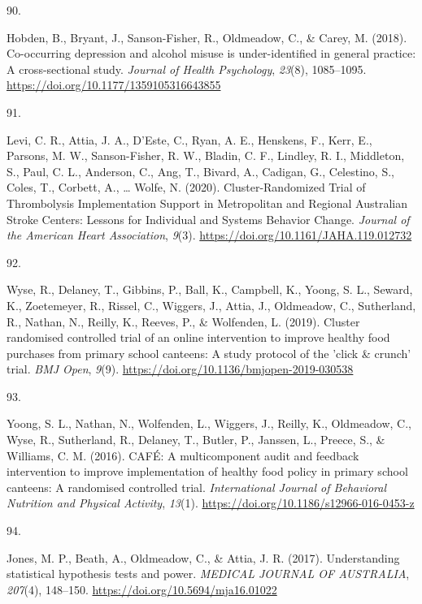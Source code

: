 \documentclass[11pt, a4paper]{awesome-cv}
\newlength{\csllabelwidth}
\newcommand{\CSLLeftMargin}[1]{\parbox[t]{\csllabelwidth}{#1}}
\newcommand{\CSLRightInline}[1]{\parbox[t]{\linewidth - \csllabelwidth}{#1}}
\begin{document}
\leavevmode\hypertarget{ref-hobden_co-occurring_2018}{}%
\CSLLeftMargin{90. }
\CSLRightInline{Hobden, B., Bryant, J., Sanson-Fisher, R., Oldmeadow,
C., \& Carey, M. (2018). Co-occurring depression and alcohol misuse is
under-identified in general practice: A cross-sectional study.
\emph{Journal of Health Psychology}, \emph{23}(8), 1085--1095.
\url{https://doi.org/10.1177/1359105316643855}}

\leavevmode\hypertarget{ref-levi_cluster-randomized_2020}{}%
\CSLLeftMargin{91. }
\CSLRightInline{Levi, C. R., Attia, J. A., D'Este, C., Ryan, A. E.,
Henskens, F., Kerr, E., Parsons, M. W., Sanson-Fisher, R. W., Bladin, C.
F., Lindley, R. I., Middleton, S., Paul, C. L., Anderson, C., Ang, T.,
Bivard, A., Cadigan, G., Celestino, S., Coles, T., Corbett, A., \ldots{}
Wolfe, N. (2020). Cluster-Randomized Trial of Thrombolysis
Implementation Support in Metropolitan and Regional Australian Stroke
Centers: Lessons for Individual and Systems Behavior Change.
\emph{Journal of the American Heart Association}, \emph{9}(3).
\url{https://doi.org/10.1161/JAHA.119.012732}}

\leavevmode\hypertarget{ref-wyse_cluster_2019}{}%
\CSLLeftMargin{92. }
\CSLRightInline{Wyse, R., Delaney, T., Gibbins, P., Ball, K., Campbell,
K., Yoong, S. L., Seward, K., Zoetemeyer, R., Rissel, C., Wiggers, J.,
Attia, J., Oldmeadow, C., Sutherland, R., Nathan, N., Reilly, K.,
Reeves, P., \& Wolfenden, L. (2019). Cluster randomised controlled trial
of an online intervention to improve healthy food purchases from primary
school canteens: A study protocol of the 'click \& crunch' trial.
\emph{BMJ Open}, \emph{9}(9).
\url{https://doi.org/10.1136/bmjopen-2019-030538}}

\leavevmode\hypertarget{ref-yoong_cafe_2016}{}%
\CSLLeftMargin{93. }
\CSLRightInline{Yoong, S. L., Nathan, N., Wolfenden, L., Wiggers, J.,
Reilly, K., Oldmeadow, C., Wyse, R., Sutherland, R., Delaney, T.,
Butler, P., Janssen, L., Preece, S., \& Williams, C. M. (2016). CAFÉ: A
multicomponent audit and feedback intervention to improve implementation
of healthy food policy in primary school canteens: A randomised
controlled trial. \emph{International Journal of Behavioral Nutrition
and Physical Activity}, \emph{13}(1).
\url{https://doi.org/10.1186/s12966-016-0453-z}}

\leavevmode\hypertarget{ref-jones_understanding_2017}{}%
\CSLLeftMargin{94. }
\CSLRightInline{Jones, M. P., Beath, A., Oldmeadow, C., \& Attia, J. R.
(2017). Understanding statistical hypothesis tests and power.
\emph{MEDICAL JOURNAL OF AUSTRALIA}, \emph{207}(4), 148--150.
\url{https://doi.org/10.5694/mja16.01022}}
\end{document}
